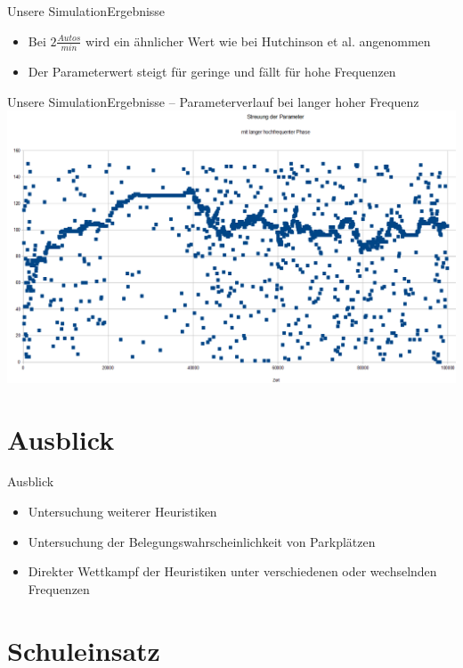 \documentclass[11pt]{beamer}
\begin{document}
\begin{frame}{Unsere Simulation}{Ergebnisse}
\begin{itemize}
	\item Bei $2 \frac{Autos}{min}$ wird ein ähnlicher Wert wie bei Hutchinson et al. angenommen
	\item Der Parameterwert steigt für geringe und fällt für hohe Frequenzen
\end{itemize}
\end{frame}

\begin{frame}{Unsere Simulation}{Ergebnisse -- Parameterverlauf bei langer hoher Frequenz}
	\includegraphics[width=\textwidth]{streuung_long.PNG}
\end{frame}

\section{Ausblick}

\begin{frame}{Ausblick}
	\begin{itemize}
		\item Untersuchung weiterer Heuristiken
		\item Untersuchung der Belegungswahrscheinlichkeit von Parkplätzen
		\item Direkter Wettkampf der Heuristiken unter verschiedenen oder wechselnden Frequenzen
	\end{itemize}
\end{frame}

\section{Schuleinsatz}
\end{document}
